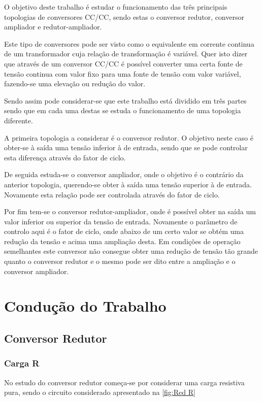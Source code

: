\documentclass[a4paper,11pt]{article}
\numberwithin{equation}{section}
\begin{document}
O objetivo deste trabalho é estudar o funcionamento das três principais topologias de conversores CC/CC, sendo estas o conversor redutor, conversor ampliador e redutor-ampliador.

Este tipo de conversores pode ser visto como o equivalente em corrente continua de um transformador cuja relação de transformação é variável. Quer isto dizer que através de um conversor CC/CC é possível converter uma certa fonte de tensão continua com valor fixo para uma fonte de tensão com valor variável, fazendo-se uma elevação ou redução do valor. \cite{Rashid}

Sendo assim pode considerar-se que este trabalho está dividido em três partes sendo que em cada uma destas se estuda o funcionamento de uma topologia diferente.

A primeira topologia a considerar é o conversor redutor. O objetivo neste caso é obter-se à saída uma tensão inferior à de entrada, sendo que se pode controlar esta diferença através do fator de ciclo.

De seguida estuda-se o conversor ampliador, onde o objetivo é o contrário da anterior topologia, querendo-se obter à saída uma tensão superior à de entrada. Novamente esta relação pode ser controlada através do fator de ciclo.

Por fim tem-se o conversor redutor-ampliador, onde é possível obter na saída um valor inferior ou superior da tensão de entrada. Novamente o parâmetro de controlo aqui é o fator de ciclo, onde abaixo de um certo valor se obtém uma redução da tensão e acima uma ampliação desta. Em condições de operação semelhantes este conversor não consegue obter uma redução de tensão tão grande quanto o conversor redutor e o mesmo pode ser dito entre a ampliação e o conversor ampliador.


\section{Condução do Trabalho}

\subsection{Conversor Redutor}

\subsubsection{Carga R}

No estudo do conversor redutor começa-se por considerar uma carga resistiva pura, sendo o circuito considerado apresentado na \autoref{fig:Red R}
\end{document}
